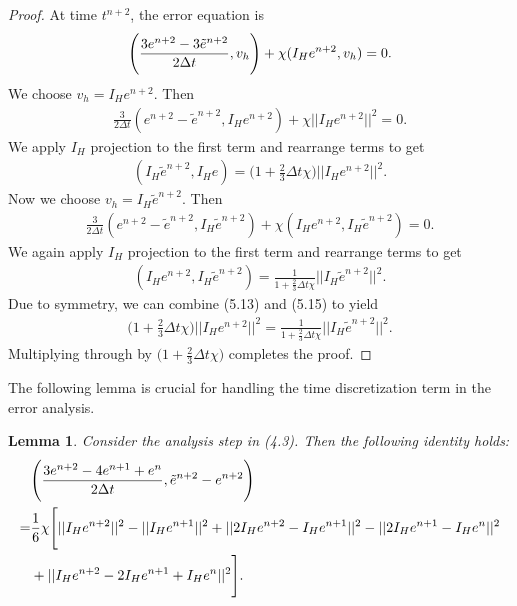 \documentclass[10pt,a4paper]{amsart}
\newtheorem{lemma}[theorem]{Lemma}
\begin{document}
\begin{proof}
    At time $t^{n+2}$, the error equation is
    \begin{align}
        \Bigg(\frac{3e^{n+2}-3\Tilde{e}^{n+2}}{2\Delta t},v_h\Bigg) +\chi (I_He^{n+2}, v_h)=0.
    \end{align}
    We choose $v_h=I_He^{n+2}$. Then
    \begin{align}
        \frac{3}{2\Delta t}(e^{n+2}-\tilde{e}^{n+2}, I_He^{n+2})+\chi||I_He^{n+2}||^2=0.
    \end{align}
    We apply $I_H$ projection to the first term and rearrange terms to get
    \begin{align}
        (I_H\tilde{e}^{n+2}, I_He)=\Bigg(1+\frac{2}{3}\Delta t\chi \Bigg)||I_He^{n+2}||^2.
    \end{align}
    Now we choose $v_h=I_H\tilde{e}^{n+2}$. Then
    \begin{align}
        \frac{3}{2\Delta t}(e^{n+2}-\tilde{e}^{n+2}, I_H\tilde{e}^{n+2})+\chi(I_He^{n+2}, I_H\tilde{e}^{n+2})=0.
    \end{align}
    We again apply $I_H$ projection to the first term and rearrange terms to get
    \begin{align}
        (I_He^{n+2}, I_H\tilde{e}^{n+2})=\frac{1}{1+\frac{2}{3}\Delta t \chi}||I_H\tilde{e}^{n+2}||^2.
    \end{align}
    Due to symmetry, we can combine (5.13) and (5.15) to yield
    \begin{align}
        \Bigg(1+\frac{2}{3}\Delta t \chi\Bigg)||I_He^{n+2}||^2=\frac{1}{1+\frac{2}{3}\Delta t\chi}||I_H\tilde{e}^{n+2}||^2.
    \end{align}
    Multiplying through by $\Bigg(1+\frac{2}{3}\Delta t\chi\Bigg)$ completes the proof.
\end{proof}

The following lemma is crucial for handling the time discretization term in the error analysis.

\begin{lemma}
    Consider the analysis step in (4.3). Then the following identity holds:
    \begin{align}
        &\Bigg(\frac{3e^{n+2}-4e^{n+1}+e^n}{2\Delta t}, \Tilde{e}^{n+2}-e^{n+2}\Bigg) \notag \\
        =&\frac{1}{6}\chi \Bigg[ ||I_He^{n+2}||^2-||I_He^{n+1}||^2 + ||2I_He^{n+2}-I_He^{n+1}||^2 - ||2I_He^{n+1}-I_He^n||^2 \\
        &+ ||I_He^{n+2}-2I_He^{n+1}+I_He^n||^2\Bigg]. \notag
    \end{align}
\end{lemma}
\end{document}
